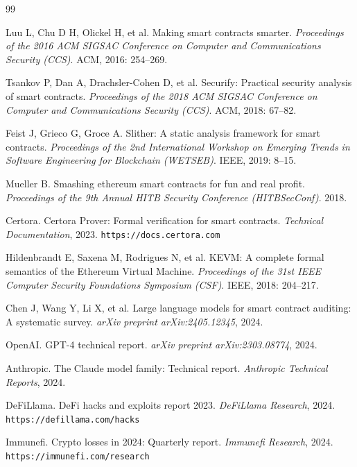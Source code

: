 \documentclass[10.5pt,compsoc]{CjC}
\begin{document}
\begin{thebibliography}{99}
\addtolength{\itemsep}{-0.8em}

Luu L, Chu D H, Olickel H, et al.
Making smart contracts smarter.
\emph{Proceedings of the 2016 ACM SIGSAC Conference on Computer and Communications Security (CCS)}. ACM, 2016: 254--269.

Tsankov P, Dan A, Drachsler-Cohen D, et al.
Securify: Practical security analysis of smart contracts.
\emph{Proceedings of the 2018 ACM SIGSAC Conference on Computer and Communications Security (CCS)}. ACM, 2018: 67--82.

Feist J, Grieco G, Groce A.
Slither: A static analysis framework for smart contracts.
\emph{Proceedings of the 2nd International Workshop on Emerging Trends in Software Engineering for Blockchain (WETSEB)}. IEEE, 2019: 8--15.

Mueller B.
Smashing ethereum smart contracts for fun and real profit.
\emph{Proceedings of the 9th Annual HITB Security Conference (HITBSecConf)}. 2018.

Certora.
Certora Prover: Formal verification for smart contracts.
\emph{Technical Documentation}, 2023. \texttt{https://docs.certora.com}

Hildenbrandt E, Saxena M, Rodrigues N, et al.
KEVM: A complete formal semantics of the Ethereum Virtual Machine.
\emph{Proceedings of the 31st IEEE Computer Security Foundations Symposium (CSF)}. IEEE, 2018: 204--217.

Chen J, Wang Y, Li X, et al.
Large language models for smart contract auditing: A systematic survey.
\emph{arXiv preprint arXiv:2405.12345}, 2024.

OpenAI.
GPT-4 technical report.
\emph{arXiv preprint arXiv:2303.08774}, 2024.

Anthropic.
The Claude model family: Technical report.
\emph{Anthropic Technical Reports}, 2024.

DeFiLlama.
DeFi hacks and exploits report 2023.
\emph{DeFiLlama Research}, 2024. \texttt{https://defillama.com/hacks}

Immunefi.
Crypto losses in 2024: Quarterly report.
\emph{Immunefi Research}, 2024. \texttt{https://immunefi.com/research}


\end{thebibliography}
\end{document}
